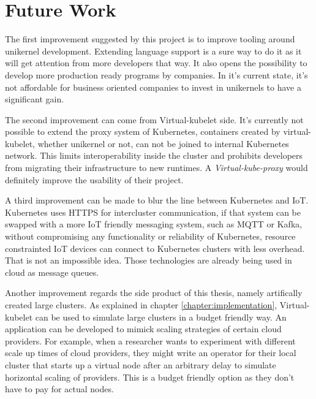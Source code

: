 \section{Future Work}
The first improvement suggested by this project is to improve tooling around unikernel development. Extending language support is a sure way to do it as it will get attention from more developers that way. It also opens the possibility to develop more production ready programs by companies. In it's current state, it's not affordable for business oriented companies to invest in unikernels to have a significant gain.

The second improvement can come from Virtual-kubelet side. It's currently not possible to extend the proxy system of Kubernetes, containers created by virtual-kubelet, whether unikernel or not, can not be joined to internal Kubernetes network. This limits interoperability inside the cluster and prohibits developers from migrating their infrastructure to new runtimes. A \textit{Virtual-kube-proxy} would definitely improve the usability of their project.

A third improvement can be made to blur the line between Kubernetes and IoT. Kubernetes uses HTTPS for intercluster communication, if that system can be swapped with a more IoT friendly messaging system, such as MQTT or Kafka, without compromising any functionality or reliability of Kubernetes, resource constrainted IoT devices can connect to Kubernetes clusters with less overhead. That is not an impossible idea. Those technologies are already being used in cloud as message queues.

Another improvement regards the side product of this thesis, namely artifically created large clusters. As explained in chapter \ref{chapter:implementation}, Virtual-kubelet can be used to simulate large clusters in a budget friendly way. An application can be developed to mimick scaling strategies of certain cloud providers. For example, when a researcher wants to experiment with different scale up times of cloud providers, they might write an operator for their local cluster that starts up a virtual node after an arbitrary delay to simulate horizontal scaling of providers. This is a budget friendly option as they don't have to pay for actual nodes.